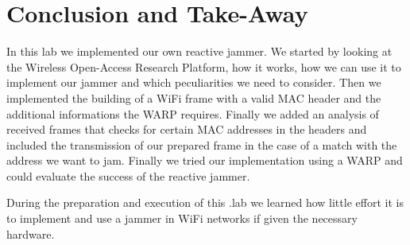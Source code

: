 \documentclass[sigconf]{acmart}
\begin{document}

\section{Conclusion and Take-Away}
In this lab we implemented our own reactive jammer. We started by looking at the Wireless Open-Access Research Platform,
how it works, how we can use it to implement our jammer and which peculiarities we need to consider. Then we implemented
the building of a WiFi frame with a valid MAC header and the additional informations the WARP requires. Finally we added
an analysis of received frames that checks for certain MAC addresses in the headers and included the transmission of our
prepared frame in the case of a match with the address we want to jam. Finally we tried our implementation using a WARP
and could evaluate the success of the reactive jammer.

During the preparation and execution of this .lab we learned how little effort it is to implement and use a jammer in WiFi
networks if given the necessary hardware.
\end{document}
